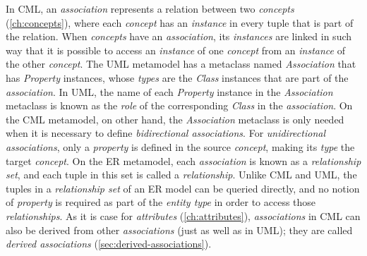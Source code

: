 \begin{definition}
In CML,
an \emph{association} represents a relation between two \emph{concepts} (\ref{ch:concepts}),
where each \emph{concept} has an \emph{instance} in every tuple that is part of the relation.
When \emph{concepts} have an \emph{association},
its \emph{instances} are linked in such way that
it is possible to access an \emph{instance} of one \emph{concept}
from an \emph{instance} of the other \emph{concept}.
The UML \cite{uml} metamodel has a metaclass named \emph{Association} that has \emph{Property} instances,
whose \emph{types} are the \emph{Class} instances that are part of the \emph{association}.
In UML, the name of each \emph{Property} instance in the \emph{Association} metaclass
is known as the \emph{role} of the corresponding \emph{Class} in the \emph{association}.
On the CML metamodel, on other hand,
the \emph{Association} metaclass is only needed
when it is necessary to define \emph{bidirectional associations}.
For \emph{unidirectional associations},
only a \emph{property} is defined in the source \emph{concept},
making its \emph{type} the target \emph{concept}.
On the ER \cite{er} metamodel,
each \emph{association} is known as a \emph{relationship set},
and each tuple in this set is called a \emph{relationship}.
Unlike CML and UML,
the tuples in a \emph{relationship set} of an ER model
can be queried directly,
and no notion of \emph{property} is required as part of the \emph{entity type}
in order to access those \emph{relationships}.
As it is case for \emph{attributes} (\ref{ch:attributes}),
\emph{associations} in CML can also be derived from other \emph{associations}
(just as well as in UML);
they are called \emph{derived associations} (\ref{sec:derived-associations}).
\end{definition}


